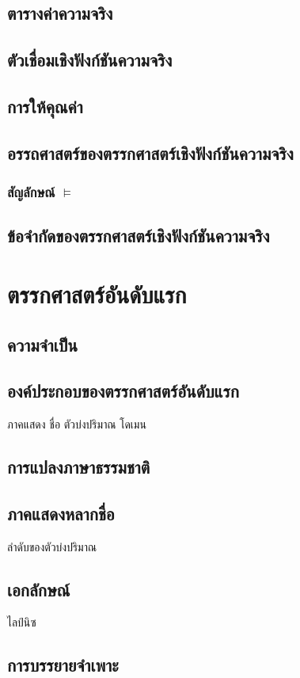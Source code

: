 \documentclass[a4paper,12pt]{extbook}
\theoremstyle{definition}
\theoremstyle{remark}
\begin{document}
		\section{ตารางค่าความจริง}
		\section{ตัวเชื่อมเชิงฟังก์ชันความจริง}
		\section{การให้คุณค่า}
		\section{อรรถศาสตร์ของตรรกศาสตร์เชิงฟังก์ชันความจริง}
		\subsection{สัญลักษณ์ $\vDash$}
		\section{ข้อจำกัดของตรรกศาสตร์เชิงฟังก์ชันความจริง}
		
	\chapter{ตรรกศาสตร์อันดับแรก}
		\section{ความจำเป็น}
		\section{องค์ประกอบของตรรกศาสตร์อันดับแรก} ภาคแสดง ชื่อ ตัวบ่งปริมาณ โดเมน
		\section{การแปลงภาษาธรรมชาติ}
		\section{ภาคแสดงหลากชื่อ} ลำดับของตัวบ่งปริมาณ
		\section{เอกลักษณ์} ไลป์นิซ
		\section{การบรรยายจำเพาะ}
\end{document}
